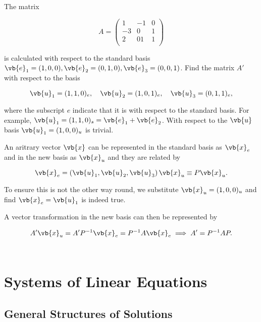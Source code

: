 \documentclass[a4paper,12pt]{report}
\begin{document}
{The matrix 

\begin{equation}
    A = \begin{pmatrix}
        1 & -1 &  0 \\
        -3 & 0 &  1 \\
        2 & 01 &  1 \\
    \end{pmatrix}
\end{equation}

is calculated with respect to the standard basis \(\vb{e} _{1} = (1,0,0), \vb{e} _{2}= (0,1,0), \vb{e} _{3} = (0,0,1)   \). Find the matrix \(A'\) with respect to the basis 

\begin{equation}
    \vb{u} _{1} = (1,1,0)_{e},\quad  \vb{u} _{2} = (1,0,1)_{e} , \quad \vb{u} _{3} = (0,1,1)_{e},
\end{equation}

where the subscript \(e\) indicate that it is with respect to the standard basis. For example, \(\vb{u} _{1} = (1,1,0)_{s} = \vb{e} _{1} + \vb{e} _{2}\). With respect to the \(\vb{u} \) basis \(\vb{u} _{1} = (1,0,0)_{u} \) is trivial.  

An aritrary vector \(\vb{x} \) can be represented in the standard basis as \(\vb{x} _{e} \) and in the new basis as \(\vb{x} _{u} \) and they are related by  

\begin{equation}
    \vb{x} _{e} = \left( \vb{u} _{1}, \vb{u} _{2},\vb{u} _{3}    \right) \vb{x} _{u} \equiv P \vb{x} _{u}. 
\end{equation}

To ensure this is not the other way round, we substitute \(\vb{x} _{u} = (1,0,0)_{u} \) and find \(\vb{x} _{e} = \vb{u} _{1}  \) is indeed true. 

A vector transformation in the new basis can then be represented by

\begin{equation}
    A' \vb{x} _{u} = A' P^{-1} \vb{x} _{e} = P^{-1} A \vb{x} _{e} \implies A' = P^{-1} A P.
\end{equation}
~
}
{} 



\section{Systems of Linear Equations}

\subsection{General Structures of Solutions}
\end{document}
